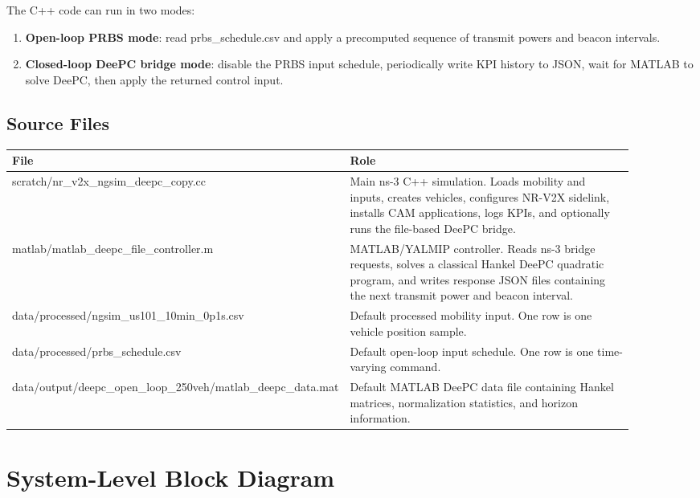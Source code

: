 \documentclass[11pt]{article}
\DeclareRobustCommand{\code}[1]{\texttt{\detokenize{#1}}}
\def\code#1{#1}%
\begin{document}
The C++ code can run in two modes:

\begin{enumerate}
  \item \textbf{Open-loop PRBS mode}: read \code{prbs_schedule.csv} and apply a
  precomputed sequence of transmit powers and beacon intervals.
  \item \textbf{Closed-loop DeePC bridge mode}: disable the PRBS input schedule,
  periodically write KPI history to JSON, wait for MATLAB to solve DeePC, then
  apply the returned control input.
\end{enumerate}

\subsection{Source Files}

\begin{center}
\begin{tabular}{L{0.34\linewidth}L{0.56\linewidth}}
\toprule
File & Role \\
\midrule
\code{scratch/nr_v2x_ngsim_deepc_copy.cc} &
Main ns-3 C++ simulation.  Loads mobility and inputs, creates vehicles, configures
NR-V2X sidelink, installs CAM applications, logs KPIs, and optionally runs the
file-based DeePC bridge. \\
\code{matlab/matlab_deepc_file_controller.m} &
MATLAB/YALMIP controller.  Reads ns-3 bridge requests, solves a classical Hankel
DeePC quadratic program, and writes response JSON files containing the next
transmit power and beacon interval. \\
\code{data/processed/ngsim_us101_10min_0p1s.csv} &
Default processed mobility input.  One row is one vehicle position sample. \\
\code{data/processed/prbs_schedule.csv} &
Default open-loop input schedule.  One row is one time-varying command. \\
\code{data/output/deepc_open_loop_250veh/matlab_deepc_data.mat} &
Default MATLAB DeePC data file containing Hankel matrices, normalization
statistics, and horizon information. \\
\bottomrule
\end{tabular}
\end{center}

\section{System-Level Block Diagram}
\end{document}
